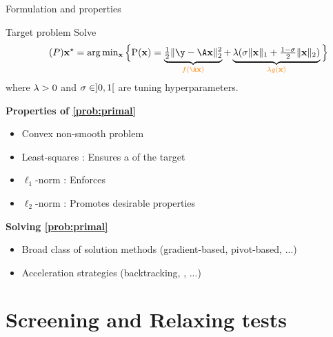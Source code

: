 \documentclass[10pt]{beamer}
\begin{document}
\begin{frame}{Formulation and properties}
  \begin{block}{Target problem}
    Solve
    \begin{equation}
      \label{prob:primal}
      \tag{$\ppb$}
      \opt{\pv} = \textstyle\arg\min_{\pv} 
      \Big\{ 
        \pfunc(\pv) = 
        \underbrace{
          \tfrac{1}{2}\norm{\obs-\dic\pv}{2}^2
        }_{
          \emphone{\lossfunc(\dic\pv)}
        }
      +
        \underbrace{
          \reg
          (\enetparam\norm{\pv}{1} + \tfrac{1-\enetparam}{2}\norm{\pv}{2})
        }_{
          \emphone{\reg\regfunc(\pv)}
        }
      \Big\}
    \end{equation}
    where $\lambda > 0$ and $\sigma \in ]0,1[$ are tuning hyperparameters.
  \end{block}
  
  \pause
  \textbf{Properties of \eqref{prob:primal}}
  \begin{itemize}
    \item Convex non-smooth problem
    \item Least-squares : Ensures a  of the target
    \item $\ell_1$-norm : Enforces 
    \item $\ell_2$-norm : Promotes desirable properties
  \end{itemize}

  \pause
  \textbf{Solving \eqref{prob:primal}}
  \begin{itemize}
    \item Broad class of solution methods (gradient-based, pivot-based, ...)
    \item Acceleration strategies (backtracking, , ...)
  \end{itemize}
\end{frame}

\section{Screening and Relaxing tests}
\end{document}
